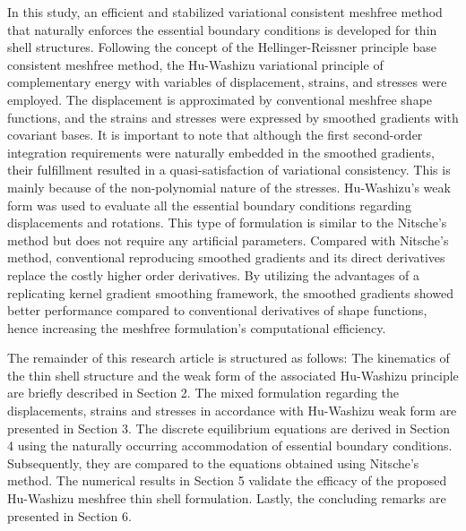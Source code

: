 In this study, an efficient and stabilized variational consistent meshfree method that naturally enforces the essential boundary conditions is developed for thin shell structures. Following the concept of the Hellinger-Reissner principle base consistent meshfree method, the Hu-Washizu variational principle of complementary energy with variables of displacement, strains, and stresses were employed. The displacement is approximated by conventional meshfree shape functions, and the strains and stresses were expressed by smoothed gradients with covariant bases. It is important to note that although the first second-order integration requirements were naturally embedded in the smoothed gradients, their fulfillment resulted in a quasi-satisfaction of variational consistency. This is mainly because of the non-polynomial nature of the stresses. Hu-Washizu's weak form was used to evaluate all the essential boundary conditions regarding displacements and rotations. This type of formulation is similar to the Nitsche's method but does not require any artificial parameters. Compared with Nitsche’s method, conventional reproducing smoothed gradients and its direct derivatives replace the costly higher order derivatives. By utilizing the advantages of a replicating kernel gradient smoothing framework, the smoothed gradients showed better performance compared to conventional derivatives of shape functions, hence increasing the meshfree formulation's computational efficiency.

The remainder of this research article is structured as follows: The kinematics of the thin shell structure and the weak form of the associated Hu-Washizu principle are briefly described in Section 2. The mixed formulation regarding the displacements, strains and stresses in accordance with Hu-Washizu weak form are presented in Section 3. The discrete equilibrium equations are derived in Section 4 using the naturally occurring accommodation of essential boundary conditions. Subsequently, they are compared to the equations obtained using Nitsche's method. The numerical results in Section 5 validate the efficacy of the proposed Hu-Washizu meshfree thin shell formulation. Lastly, the concluding remarks are presented in Section 6.

